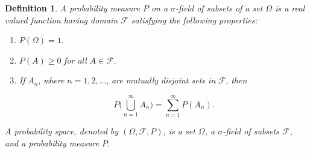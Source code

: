 \documentclass{article}
\theoremstyle{definition}
\newtheorem{definition}{Definition}[section]
\theoremstyle{remark}
\theoremstyle{definition}
\begin{document}
\begin{definition}
    \textit{A probability measure $P$ on a $\sigma$-field of subsets of a set $\Omega$ is a real valued function having domain $\mathcal{F}$ satisfying the following properties:}
    
    \begin{enumerate}[label=(\roman*)]
        \item $P(\Omega)=1$.
        \item $P(A)\geq 0$ \textit{for all} $A\in\mathcal{F}$.
        \item \textit{If} $A_n$, \textit{where} $n=1,2,\dots$, \textit{are mutually disjoint sets in} $\mathcal{F}$, \textit{then}
        
        \begin{equation*}
            P\bigg(\bigcup_{n=1}^{\infty} A_n\bigg)=\sum_{n=1}^{\infty}P(A_n).
        \end{equation*}
    \end{enumerate}
    
    \noindent\textit{A probability space, denoted by $(\Omega,\mathcal{F}, P)$, is a set $\Omega$, a $\sigma$-field of subsets $\mathcal{F}$, and a probability measure $P$.}
\end{definition}
\end{document}

